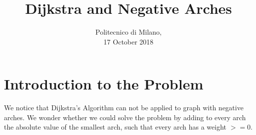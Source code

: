 \documentclass[1pt]{article}
\title{\huge \textrm{Dijkstra and Negative Arches}}
\date{\textrm{Politecnico di Milano, \\17 October 2018}}
\begin{document}
	\begin{titlepage}
		\maketitle
	\end{titlepage}


	\newpage
	\section{Introduction to the Problem}
		We notice that Dijkstra's Algorithm can not be applied to graph with negative arches. We wonder whether we could solve the problem by adding to every arch the absolute value of the smallest arch, such that every arch has a weight $>= 0$.
\end{document}

